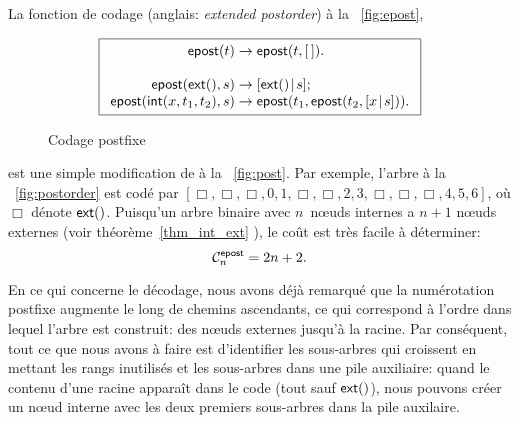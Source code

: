 La fonction de codage
(anglais: \emph{extended postorder}) à la \fig~\vref{fig:epost},
\begin{figure}[b]
\begin{equation*}
\boxed{
\begin{array}{r@{\;}c@{\;}l}
\fun{epost}(t) & \rightarrow & \fun{epost}(t,\el).\\
\\
\fun{epost}(\fun{ext}(),s) & \rightarrow
  & \cons{\fun{ext}()}{s};\\
\fun{epost}(\fun{int}(x,t_1,t_2),s) & \rightarrow
  & \fun{epost}(t_1,\fun{epost}(t_2,\cons{x}{s})).
\end{array}}
\end{equation*}
\caption{Codage postfixe}
\label{fig:epost}
\end{figure}
est une simple modification de  à
la \fig~\vref{fig:post}. Par exemple, l'arbre à la
\fig~\vref{fig:postorder} est codé par \([\Box, \Box, \Box, 0, 1,
\Box, \Box, 2, 3, \Box, \Box, \Box, 4, 5, 6]\), où \(\Box\) dénote
\(\textsf{ext}()\). Puisqu'un arbre binaire avec \(n\)~nœuds internes
a \(n+1\) nœuds externes (voir théorème~\ref{thm_int_ext}
), le coût est très facile à déterminer:
\begin{equation*}
  \C{\fun{epost}}{n} = 2n + 2.
  \index{epost@$\C{\fun{epost}}{n}$}
\end{equation*}

En ce qui concerne le décodage, nous avons déjà remarqué que la
numérotation postfixe augmente le long de chemins ascendants, ce qui
correspond à l'ordre dans lequel l'arbre est construit: des nœuds
externes jusqu'à la racine. Par conséquent, tout ce que nous avons à
faire est d'identifier les sous-arbres qui croissent en mettant les
rangs inutilisés et les sous-arbres dans une pile auxiliaire: quand le
contenu d'une racine apparaît dans le code (tout sauf
\(\textsf{ext}()\)), nous pouvons créer un nœud interne avec les deux
premiers sous-arbres dans la pile auxilaire.

